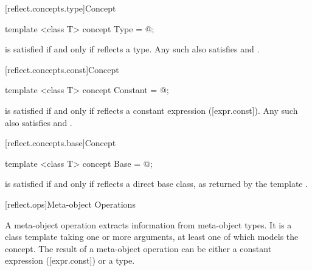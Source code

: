[reflect.concepts.type]{Concept }

\begin{std.txt}\color{addclr}

\begin{itemdecl}
template <class T> concept Type = @\seebelow@;
\end{itemdecl}

\begin{itemdescr}
\pnum
{} is satisfied if and only if  reflects a type. Any such  also satisfies  and .

\end{itemdescr}
\end{std.txt}

[reflect.concepts.const]{Concept }

\begin{std.txt}\color{addclr}

\begin{itemdecl}
template <class T> concept Constant = @\seebelow@;
\end{itemdecl}

\begin{itemdescr}
\pnum
{} is satisfied if and only if  reflects a constant expression ([expr.const]). Any such  also satisfies  and .

\end{itemdescr}
\end{std.txt}

[reflect.concepts.base]{Concept }

\begin{std.txt}\color{addclr}

\begin{itemdecl}
template <class T> concept Base = @\seebelow@;
\end{itemdecl}

\begin{itemdescr}
\pnum
{} is satisfied if and only if  reflects a direct base class, as returned by the template .

\end{itemdescr}
\end{std.txt}

[reflect.ops]{Meta-object Operations}

\begin{std.txt}\color{addclr}
\pnum
A meta-object operation extracts information from meta-object types. It is a class template taking one or more arguments, at least one of which models the  concept. The result of a meta-object operation can be either a constant expression ([expr.const]) or a type.
\end{std.txt}

